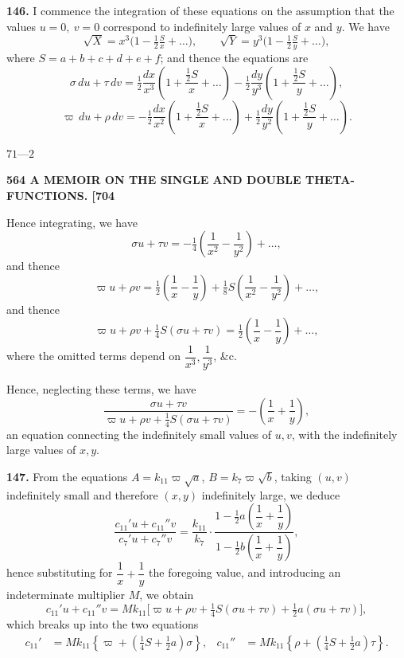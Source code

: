 \documentclass[11pt]{article}
\begin{document}
\medskip
\textbf{146.} I commence the integration of these equations on the assumption that the values $u = 0,\ v = 0$ correspond to indefinitely large values of $x$ and $y$. We have
\[
\sqrt{X} = x^3\bigl(1 - \tfrac{1}{2}\tfrac{S}{x} + \ldots\bigr),\qquad \sqrt{Y} = y^3\bigl(1 - \tfrac{1}{2}\tfrac{S}{y} + \ldots\bigr),
\]
where $S = a + b + c + d + e + f$; and thence the equations are
\[
\sigma\,du+\tau\,dv=\tfrac{1}{2}\frac{dx}{x^3}\!\left(1+\frac{\tfrac{1}{2}S}{x}+\ldots\right)
-\tfrac{1}{2}\frac{dy}{y^3}\!\left(1+\frac{\tfrac{1}{2}S}{y}+\ldots\right),
\]
\[
\varpi\,du+\rho\,dv=-\tfrac{1}{2}\frac{dx}{x^2}\!\left(1+\frac{\tfrac{1}{2}S}{x}+\ldots\right)
+\tfrac{1}{2}\frac{dy}{y^2}\!\left(1+\frac{\tfrac{1}{2}S}{y}+\ldots\right).
\]

\hfill $71$---$2$

\newpage
\noindent\textbf{564 \hfill A MEMOIR ON THE SINGLE AND DOUBLE THETA-FUNCTIONS. \hfill [704}

\medskip
Hence integrating, we have
\[
\sigma u+\tau v=-\tfrac{1}{4}\!\left(\frac{1}{x^2}-\frac{1}{y^2}\right)+\ldots,
\]
and thence
\[
\varpi u+\rho v=\tfrac{1}{2}\!\left(\frac{1}{x}-\frac{1}{y}\right)
+\tfrac{1}{8}S\!\left(\frac{1}{x^2}-\frac{1}{y^2}\right)+\ldots,
\]
and thence
\[
\varpi u+\rho v+\tfrac{1}{4}S(\sigma u+\tau v)
=\tfrac{1}{2}\!\left(\frac{1}{x}-\frac{1}{y}\right)+\ldots,
\]
where the omitted terms depend on $\dfrac{1}{x^3},\dfrac{1}{y^3}$, \&c.

\medskip
Hence, neglecting these terms, we have
\[
\frac{\sigma u + \tau v}{\varpi u + \rho v + \tfrac{1}{4}S(\sigma u + \tau v)} = -\!\left(\frac{1}{x} + \frac{1}{y}\right),
\]
an equation connecting the indefinitely small values of $u, v$, with the indefinitely large values of $x, y$.

\medskip
\textbf{147.} From the equations $A = k_{11}\varpi\sqrt{a}$, $B = k_7\varpi\sqrt{b}$, taking $(u, v)$ indefinitely small and therefore $(x, y)$ indefinitely large, we deduce
\[
\frac{c_{11}'u + c_{11}''v}{c_7'u + c_7''v}
= \frac{k_{11}}{k_7}\cdot
\frac{1 - \tfrac{1}{2}a\!\left(\dfrac{1}{x} + \dfrac{1}{y}\right)}
     {1 - \tfrac{1}{2}b\!\left(\dfrac{1}{x} + \dfrac{1}{y}\right)},
\]
hence substituting for $\dfrac{1}{x} + \dfrac{1}{y}$ the foregoing value, and introducing an indeterminate multiplier $M$, we obtain
\[
c_{11}'u + c_{11}''v = Mk_{11}\bigl[\varpi u + \rho v + \tfrac{1}{4}S(\sigma u + \tau v) + \tfrac{1}{2}a(\sigma u + \tau v)\bigr],
\]
which breaks up into the two equations
\[
\begin{aligned}
c_{11}' &= Mk_{11}\left\{\varpi+\left(\tfrac{1}{4}S+\tfrac{1}{2}a\right)\sigma\right\},&
c_{11}'' &= Mk_{11}\left\{\rho+\left(\tfrac{1}{4}S+\tfrac{1}{2}a\right)\tau\right\}.
\end{aligned}
\]
\end{document}

